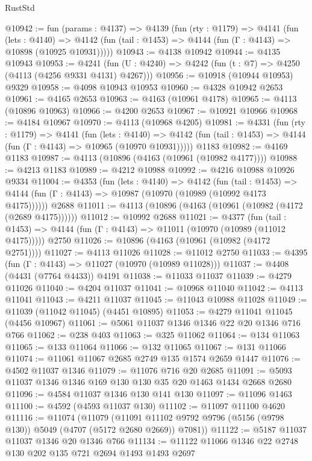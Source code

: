 \begin{lexlean}{RustStd}
\begin{coremodule}
@10942 := fun (params : @4137) =>
  @4139
    (fun (rty : @1179) =>
    @4141
      (fun (lets : @4140) =>
      @4142 (fun (tail : @1453) => @4144 (fun (Γ : @4143) => @10898 (@10925 @10931)))))
@10943 := @4138 @10942
@10944 := @4135 @10943
@10953 := @4241 (fun (U : @4240) => @4242 (fun (t : @7) => @4250 (@4113 (@4256 @9331 @4131) @4267)))
@10956 := @10918 (@10944 @10953) @9329
@10958 := @4098 @10943 @10953
@10960 := @4328 @10942 @2653
@10961 := @4165 @2653
@10963 := @4163 (@10961 @4178)
@10965 := @4113 (@10896 @10963)
@10966 := @4200 @2653
@10967 := @10921 @10966
@10968 := @4184 @10967
@10970 := @4113 (@10968 @4205)
@10981 := @4331
    (fun (rty : @1179) =>
    @4141
      (fun (lets : @4140) =>
      @4142 (fun (tail : @1453) => @4144 (fun (Γ : @4143) => @10965 (@10970 @10931)))))
    @1183
@10982 := @4169 @1183
@10987 := @4113 (@10896 (@4163 (@10961 (@10982 @4177))))
@10988 := @4213 @1183
@10989 := @4212 @10988
@10992 := @4216 @10988 @10926 @9334
@11004 := @4353
    (fun (lets : @4140) =>
    @4142
      (fun (tail : @1453) =>
      @4144 (fun (Γ : @4143) => @10987 (@10970 (@10989 (@10992 @4173 @4175))))))
    @2688
@11011 := @4113 (@10896 (@4163 (@10961 (@10982 (@4172 (@2689 @4175))))))
@11012 := @10992 @2688
@11021 := @4377
    (fun (tail : @1453) => @4144 (fun (Γ : @4143) => @11011 (@10970 (@10989 (@11012 @4175)))))
    @2750
@11026 := @10896 (@4163 (@10961 (@10982 (@4172 @2751))))
@11027 := @4113 @11026
@11028 := @11012 @2750
@11033 := @4395 (fun (Γ : @4143) => @11027 (@10970 (@10989 @11028)))
@11037 := @4408 (@4431 (@7764 @4433)) @4191
@11038 := @11033 @11037
@11039 := @4279 @11026
@11040 := @4204 @11037
@11041 := @10968 @11040
@11042 := @4113 @11041
@11043 := @4211 @11037
@11045 := @11043 @10988 @11028
@11049 := @11039 (@11042 @11045) (@4451 @10895)
@11053 := @4279 @11041 @11045 (@4456 @10967)
@11061 := @5061 @11037 @1346 @1346 @22 @20 @1346 @716 @766
@11062 := @238 @403
@11063 := @325 @11062
@11064 := @134 @11063
@11065 := @133 @11064
@11066 := @132 @11065
@11067 := @131 @11066
@11074 := @11061 @11067 @2685 @2749 @135 @1574 @2659 @1447
@11076 := @4502 @11037 @1346
@11079 := @11076 @716 @20 @2685
@11091 := @5093 @11037 @1346 @1346 @169 @130 @130 @35 @20 @1463 @1434 @2668 @2680
@11096 := @4584 @11037 @1346 @130 @141 @130
@11097 := @11096 @1463
@11100 := @4592 (@4593 @11037 @130)
@11102 := @11097 @11100 @4620
@11116 := @11074
    (@11079
      (@11091 @11102 @9792 @9796 (@5156 (@9798 @130)) @5049 (@4707 (@5172 @2680 @2669)) @7081))
@11122 := @5187 @11037 @11037 @1346 @20 @1346 @766
@11134 := @11122 @11066 @1346 @22 @2748 @130 @202 @135 @721 @2694 @1493 @1493 @2697

\end{coremodule}
\end{lexlean}

